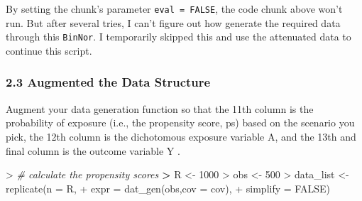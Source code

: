 \documentclass[
]{article}
\newenvironment{Shaded}{\begin{snugshade}}{\end{snugshade}}
\newcommand{\AttributeTok}[1]{\textcolor[rgb]{0.77,0.63,0.00}{#1}}
\newcommand{\CommentTok}[1]{\textcolor[rgb]{0.56,0.35,0.01}{\textit{#1}}}
\newcommand{\ConstantTok}[1]{\textcolor[rgb]{0.00,0.00,0.00}{#1}}
\newcommand{\DecValTok}[1]{\textcolor[rgb]{0.00,0.00,0.81}{#1}}
\newcommand{\ErrorTok}[1]{\textcolor[rgb]{0.64,0.00,0.00}{\textbf{#1}}}
\newcommand{\FunctionTok}[1]{\textcolor[rgb]{0.00,0.00,0.00}{#1}}
\newcommand{\NormalTok}[1]{#1}
\newcommand{\OtherTok}[1]{\textcolor[rgb]{0.56,0.35,0.01}{#1}}
\newcommand{\SpecialCharTok}[1]{\textcolor[rgb]{0.00,0.00,0.00}{#1}}
\begin{document}
By setting the chunk's parameter \texttt{eval\ =\ FALSE}, the code chunk
above won't run. But after several tries, I can't figure out how
generate the required data through this \texttt{BinNor}. I temporarily
skipped this and use the attenuated data to continue this script.

\hypertarget{augmented-the-data-structure}{%
\subsubsection{2.3 Augmented the Data
Structure}\label{augmented-the-data-structure}}

Augment your data generation function so that the 11th column is the
probability of exposure (i.e., the propensity score, ps) based on the
scenario you pick, the 12th column is the dichotomous exposure variable
A, and the 13th and final column is the outcome variable Y .

\begin{Shaded}
\begin{Highlighting}[]
\SpecialCharTok{\textgreater{}} \CommentTok{\# calculate the propensity scores}
\ErrorTok{\textgreater{}}\NormalTok{ R }\OtherTok{\textless{}{-}} \DecValTok{1000}
\SpecialCharTok{\textgreater{}}\NormalTok{ obs }\OtherTok{\textless{}{-}} \DecValTok{500}
\SpecialCharTok{\textgreater{}}\NormalTok{ data\_list }\OtherTok{\textless{}{-}} \FunctionTok{replicate}\NormalTok{(}\AttributeTok{n =}\NormalTok{ R,}
\SpecialCharTok{+}                        \AttributeTok{expr =} \FunctionTok{dat\_gen}\NormalTok{(obs,}\AttributeTok{cov =}\NormalTok{ cov),}
\SpecialCharTok{+}                        \AttributeTok{simplify =} \ConstantTok{FALSE}\NormalTok{)}
\end{Highlighting}
\end{Shaded}
\end{document}
